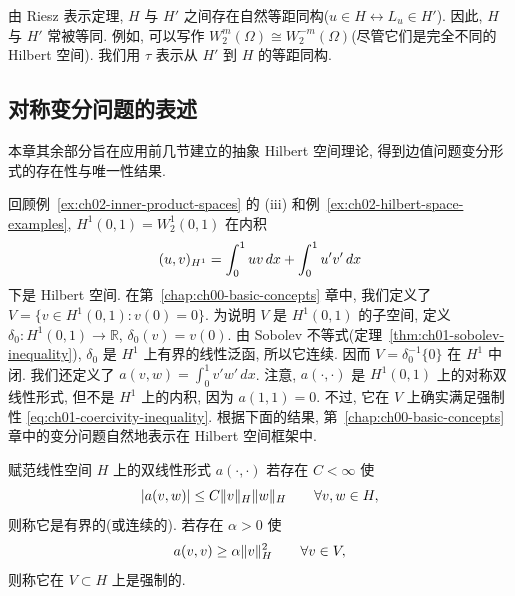 \setcounter{thmcount}{5}
\begin{Remark}
\label{rem:ch02-riesz-isometry}
由 Riesz 表示定理, $H$ 与 $H'$ 之间存在自然等距同构($u\in H\longleftrightarrow L_u\in H'$). 因此, $H$ 与 $H'$ 常被等同. 例如, 可以写作 $W_2^m(\Omega)\cong W_2^{-m}(\Omega)$(尽管它们是完全不同的 Hilbert 空间). 我们用 $\tau$ 表示从 $H'$ 到 $H$ 的等距同构.
\end{Remark}

\subsection{对称变分问题的表述}
\label{sec:ch02-symmetric-variational-problems}
\setcounter{thmcount}{0}
\setcounter{equation}{0}

本章其余部分旨在应用前几节建立的抽象 Hilbert 空间理论, 得到边值问题变分形式的存在性与唯一性结果.

\begin{Example}
\label{ex:ch02-symmetric-variational-example}
回顾例~\ref{ex:ch02-inner-product-spaces} 的 (iii) 和例~\ref{ex:ch02-hilbert-space-examples}, $H^1(0,1)=W_2^1(0,1)$ 在内积
\[
\MathBookFormulaID{formula-ch02-h-one-inner-product}
(u,v)_{H^1}=\int_0^1uv\,dx+\int_0^1u'v'\,dx
\]
下是 Hilbert 空间. 在第~\ref{chap:ch00-basic-concepts} 章中, 我们定义了 $V=\{v\in H^1(0,1):v(0)=0\}$. 为说明 $V$ 是 $H^1(0,1)$ 的子空间, 定义 $\delta_0:H^1(0,1)\longrightarrow\mathbb R$, $\delta_0(v)=v(0)$. 由 Sobolev 不等式(定理~\ref{thm:ch01-sobolev-inequality}), $\delta_0$ 是 $H^1$ 上有界的线性泛函, 所以它连续. 因而 $V=\delta_0^{-1}\{0\}$ 在 $H^1$ 中闭. 我们还定义了 $a(v,w)=\int_0^1v'w'\,dx$. 注意, $a(\cdot,\cdot)$ 是 $H^1(0,1)$ 上的对称双线性形式, 但不是 $H^1$ 上的内积, 因为 $a(1,1)=0$. 不过, 它在 $V$ 上确实满足强制性 \eqref{eq:ch01-coercivity-inequality}. 根据下面的结果, 第~\ref{chap:ch00-basic-concepts} 章中的变分问题自然地表示在 Hilbert 空间框架中.
\end{Example}

\begin{Definition}
\label{def:ch02-bounded-coercive-form}
赋范线性空间 $H$ 上的双线性形式 $a(\cdot,\cdot)$ 若存在 $C<\infty$ 使
\[
\MathBookFormulaID{formula-ch02-bounded-bilinear-form}
|a(v,w)|\leq C\|v\|_H\|w\|_H
\qquad\forall v,w\in H,
\]
则称它是有界的(或连续的). 若存在 $\alpha>0$ 使
\[
\MathBookFormulaID{formula-ch02-coercive-bilinear-form}
a(v,v)\geq\alpha\|v\|_H^2
\qquad\forall v\in V,
\]
则称它在 $V\subset H$ 上是强制的.
\end{Definition}

